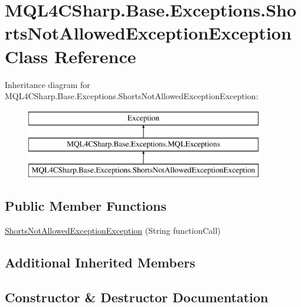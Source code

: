 \hypertarget{class_m_q_l4_c_sharp_1_1_base_1_1_exceptions_1_1_shorts_not_allowed_exception_exception}{}\section{M\+Q\+L4\+C\+Sharp.\+Base.\+Exceptions.\+Shorts\+Not\+Allowed\+Exception\+Exception Class Reference}
\label{class_m_q_l4_c_sharp_1_1_base_1_1_exceptions_1_1_shorts_not_allowed_exception_exception}
Inheritance diagram for M\+Q\+L4\+C\+Sharp.\+Base.\+Exceptions.\+Shorts\+Not\+Allowed\+Exception\+Exception\+:\begin{figure}[H]
\begin{center}
\leavevmode
\includegraphics[height=3.000000cm]{class_m_q_l4_c_sharp_1_1_base_1_1_exceptions_1_1_shorts_not_allowed_exception_exception}
\end{center}
\end{figure}
\subsection*{Public Member Functions}
\begin{DoxyCompactItemize}
\item 
\hyperlink{class_m_q_l4_c_sharp_1_1_base_1_1_exceptions_1_1_shorts_not_allowed_exception_exception_ac523d2e28fc4eba8c8391239aaddd932}{Shorts\+Not\+Allowed\+Exception\+Exception} (String function\+Call)
\end{DoxyCompactItemize}
\subsection*{Additional Inherited Members}


\subsection{Constructor \& Destructor Documentation}
